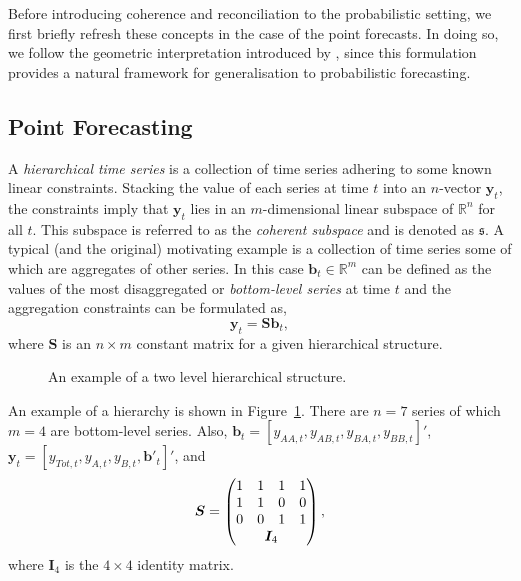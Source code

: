 \documentclass[12pt]{article}
\theoremstyle{definition}
\begin{document}
Before introducing coherence and reconciliation to the probabilistic setting, we first briefly refresh these concepts in the case of the point forecasts.  In doing so, we follow the geometric interpretation introduced by \cite{PanEtAl2019HF}, since this formulation provides a natural framework for generalisation to probabilistic forecasting.


\subsection{Point Forecasting}\label{sec:PointForecasts}

A \emph{hierarchical time series} is a collection of time series adhering to some known linear constraints.  Stacking the value of each series at time $t$ into an $n$-vector ${\bm y}_t$, the constraints imply that ${\bm y}_t$ lies in an $m$-dimensional linear subspace of $\mathbb{R}^n$ for all $t$.  This subspace is referred to as the {\em coherent subspace} and is denoted as $\mathfrak{s}$.  A typical (and the original) motivating example is a collection of time series some of which are aggregates of other series. In this case $\bm{b}_t \in \mathbb{R}^m$ can be defined as the values of the most disaggregated or \emph{bottom-level series} at time $t$ and the aggregation constraints can be formulated as,
\begin{equation*}
\bm{y}_t = \bm{Sb}_t,
\end{equation*}
where $\bm{S}$ is an $n \times m$ constant matrix for a given hierarchical structure.

\begin{figure}[H]
	\begin{center}
		 
		 
		\qobitree
	\end{center}
	\caption{An example of a two level hierarchical structure.}\label{fig:twoL-hier}
\end{figure}
An example of a hierarchy is shown in Figure~\ref{fig:twoL-hier}. There are $n=7$ series of which $m=4$ are bottom-level series. Also, $\bm{b}_t = [y_{AA,t}, y_{AB,t}, y_{BA,t}, y_{BB,t}]'$, $\bm{y}_t = [y_{Tot,t},y_{A,t}, y_{B,t},\bm{b}'_t]'$,  and
\[
\bm{S} = \begin{pmatrix}
1 & 1 & 1 & 1 \\
1 & 1 & 0 & 0 \\
0 & 0 & 1 & 1 \\
& \multicolumn{2}{c}{\bm{I}_4} &
\end{pmatrix},
\]
where $\bm{I}_4$ is the $4\times 4$ identity matrix.
\end{document}
